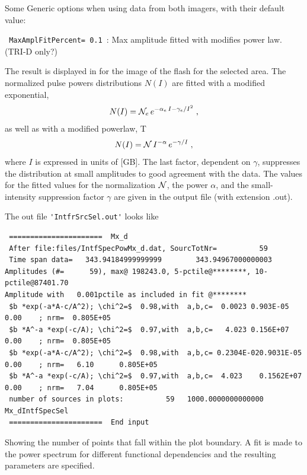 Some Generic options when using data from both imagers, with their default value:
\begin{enumerate*}
\item \verb! MaxAmplFitPercent= 0.1 !: Max amplitude fitted with modifies power law. (TRI-D only?)
\end{enumerate*}

The result is displayed in  for the image of the flash for the selected area. The normalized pulse powers distributions $N(I)$ are fitted with a modified exponential,
\begin{equation}
N(I)= {\cal N}_e \,e^{-\alpha_e\,I-\gamma_e/I^2}\;, \eqlab{PowLaw}
\end{equation}
as well as with a modified powerlaw,
T\begin{equation}
N(I)= {\cal N} \,I^{-\alpha}  \,e^{-\gamma/I}\;, \eqlab{PowLaw}
\end{equation}
where $I$ is expressed in units of [GB]. The last factor, dependent on $\gamma$, suppresses the distribution at small amplitudes to good agreement with the data. The values for the fitted values for the normalization ${\cal N}$, the power $\alpha$, and the small-intensity suppression factor $\gamma$ are given in the output file (with extension .out).

The out file \verb#'IntfrSrcSel.out'# looks like

\begin{linenumbers}
\tiny
\resetlinenumber
\begin{verbatim}
 ======================  Mx_d
 After file:files/IntfSpecPowMx_d.dat, SourcTotNr=          59
 Time span data=   343.94184999999999        343.94967000000003
Amplitudes (#=      59), max@ 198243.0, 5-pctile@********, 10-pctile@87401.70
Amplitude with   0.001pctile as included in fit @********
 $b *exp(-a*A-c/A^2); \chi^2=$  0.98,with  a,b,c=  0.0023 0.903E-05   0.00    ; nrm=  0.805E+05
 $b *A^-a *exp(-c/A); \chi^2=$  0.97,with  a,b,c=   4.023 0.156E+07   0.00    ; nrm=  0.805E+05
 $b *exp(-a*A-c/A^2); \chi^2=$  0.98,with  a,b,c= 0.2304E-020.9031E-05   0.00    ; nrm=   6.10      0.805E+05
 $b *A^-a *exp(-c/A); \chi^2=$  0.97,with  a,b,c=  4.023    0.1562E+07   0.00    ; nrm=   7.04      0.805E+05
 number of sources in plots:          59   1000.0000000000000      Mx_dIntfSpecSel
 ======================  End input
\end{verbatim}
\end{linenumbers}

Showing the number of points that fall within the plot boundary. A fit is made to the power spectrum for different functional dependencies and the resulting parameters are specified.

